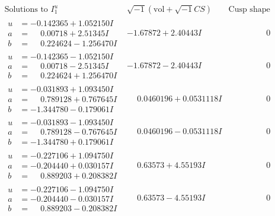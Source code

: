 \documentclass[1p]{elsarticle_modified}
\theoremstyle{definition}
\newcommand{\I}{\sqrt{-1}}
\begin{document}
$$\begin{array}{c|c|c}  
\text{Solutions to }I^u_{1}& \I (\text{vol} + \sqrt{-1}CS) & \text{Cusp shape}\\
 \hline 
\begin{aligned}
u &= -0.142365 + 1.052150 I \\
a &= \phantom{-}0.00718 + 2.51345 I \\
b &= \phantom{-}0.224624 - 1.256470 I\end{aligned}
 & -1.67872 + 2.40443 I & \phantom{-0.000000 } 0 \\ \hline\begin{aligned}
u &= -0.142365 - 1.052150 I \\
a &= \phantom{-}0.00718 - 2.51345 I \\
b &= \phantom{-}0.224624 + 1.256470 I\end{aligned}
 & -1.67872 - 2.40443 I & \phantom{-0.000000 } 0 \\ \hline\begin{aligned}
u &= -0.031893 + 1.093450 I \\
a &= \phantom{-}0.789128 + 0.767645 I \\
b &= -1.344780 - 0.179061 I\end{aligned}
 & \phantom{-}0.0460196 + 0.0531118 I & \phantom{-0.000000 } 0 \\ \hline\begin{aligned}
u &= -0.031893 - 1.093450 I \\
a &= \phantom{-}0.789128 - 0.767645 I \\
b &= -1.344780 + 0.179061 I\end{aligned}
 & \phantom{-}0.0460196 - 0.0531118 I & \phantom{-0.000000 } 0 \\ \hline\begin{aligned}
u &= -0.227106 + 1.094750 I \\
a &= -0.204440 + 0.030157 I \\
b &= \phantom{-}0.889203 + 0.208382 I\end{aligned}
 & \phantom{-}0.63573 + 4.55193 I & \phantom{-0.000000 } 0 \\ \hline\begin{aligned}
u &= -0.227106 - 1.094750 I \\
a &= -0.204440 - 0.030157 I \\
b &= \phantom{-}0.889203 - 0.208382 I\end{aligned}
 & \phantom{-}0.63573 - 4.55193 I & \phantom{-0.000000 } 0 \\ \hline\begin{aligned}

\end{aligned}
\end{array}$$
\end{document}
